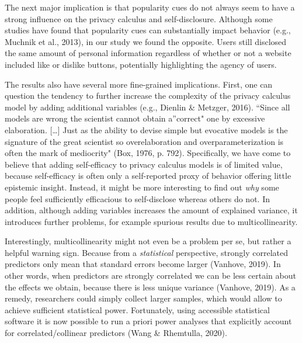 \documentclass[
  english,
  man,floatsintext]{apa6}
\begin{document}
The next major implication is that popularity cues do not always seem to have a strong influence on the privacy calculus and self-disclosure.
Although some studies have found that popularity cues can substantially impact behavior (e.g., Muchnik et al., 2013), in our study we found the opposite.
Users still disclosed the same amount of personal information regardless of whether or not a website included like or dislike buttons, potentially highlighting the agency of users.

The results also have several more fine-grained implications.
First, one can question the tendency to further increase the complexity of the privacy calculus model by adding additional variables (e.g., Dienlin \& Metzger, 2016).
\enquote{Since all models are wrong the scientist cannot obtain a}correct" one by excessive elaboration. {[}\ldots{]} Just as the ability to devise simple but evocative models is the signature of the great scientist so overelaboration and overparameterization is often the mark of mediocrity" (Box, 1976, p. 792).
Specifically, we have come to believe that adding self-efficacy to privacy calculus models is of limited value, because self-efficacy is often only a self-reported proxy of behavior offering little epistemic insight.
Instead, it might be more interesting to find out \emph{why} some people feel sufficiently efficacious to self-disclose whereas others do not.
In addition, although adding variables increases the amount of explained variance, it introduces further problems, for example spurious results due to multicollinearity.

Interestingly, multicollinearity might not even be a problem per se, but rather a helpful warning sign.
Because from a \emph{statistical} perspective, strongly correlated predictors only mean that standard errors become larger (Vanhove, 2019).
In other words, when predictors are strongly correlated we can be less certain about the effects we obtain, because there is less unique variance (Vanhove, 2019).
As a remedy, researchers could simply collect larger samples, which would allow to achieve sufficient statistical power.
Fortunately, using accessible statistical software it is now possible to run a priori power analyses that explicitly account for correlated/collinear predictors (Wang \& Rhemtulla, 2020).
\end{document}
